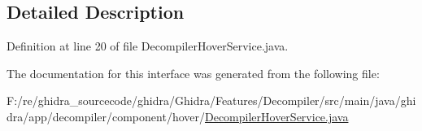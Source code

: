 \subsection{Detailed Description}


Definition at line 20 of file Decompiler\+Hover\+Service.\+java.



The documentation for this interface was generated from the following file\+:\begin{DoxyCompactItemize}
\item 
F\+:/re/ghidra\+\_\+sourcecode/ghidra/\+Ghidra/\+Features/\+Decompiler/src/main/java/ghidra/app/decompiler/component/hover/\mbox{\hyperlink{_decompiler_hover_service_8java}{Decompiler\+Hover\+Service.\+java}}\end{DoxyCompactItemize}
